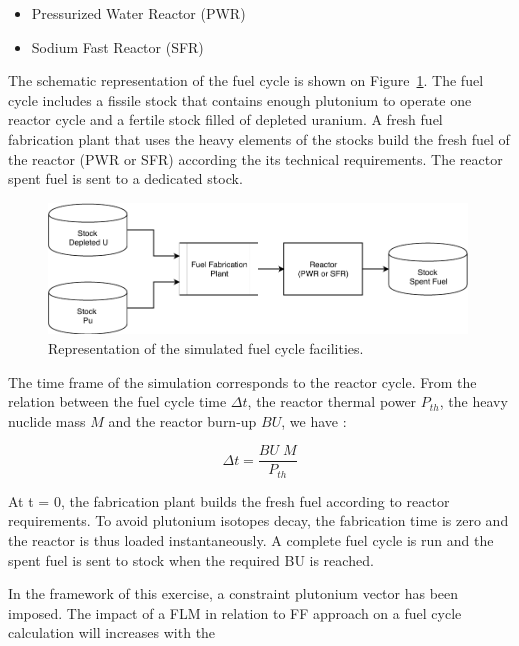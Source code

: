 \begin{itemize}
\item Pressurized Water Reactor (PWR)
\item Sodium Fast Reactor (SFR)
\end{itemize}

The schematic representation of the fuel cycle is shown on Figure~\ref{fig:FuelCycle}. The fuel cycle includes a fissile stock that contains enough plutonium to operate one reactor cycle and a fertile stock filled of depleted uranium. A fresh fuel fabrication plant that uses the heavy elements of the stocks build the fresh fuel of the reactor (PWR or SFR) according the its technical requirements. The reactor spent fuel is sent to a dedicated stock.

\begin{figure}[h]
    \begin{center}
        \includegraphics[width = 0.99\textwidth]{FIG/FuelCycleDiagram.pdf}
        \caption{Representation of the simulated fuel cycle facilities.}
        \label{fig:FuelCycle}
    \end{center}
\end{figure}

The time frame of the simulation corresponds to the reactor cycle. From the relation between the fuel cycle time $\Delta t$, the reactor thermal power $P_{th}$, the heavy nuclide mass $M$ and the reactor burn-up $BU$, we have : 

\begin{equation}
    \Delta t = \frac{BU \; M}{P_{th}}
\end{equation}

At t = 0, the fabrication plant builds the fresh fuel according to reactor requirements. To avoid plutonium isotopes decay, the fabrication time is zero and the reactor is thus loaded instantaneously. A complete fuel cycle is run and the spent fuel is sent to stock when the required BU is reached.

In the framework of this exercise, a constraint plutonium vector has been imposed. The impact of a \gls{FLM} in relation to \gls{FF} approach on a fuel cycle calculation will increases with the 

